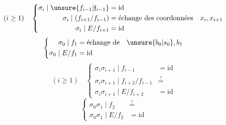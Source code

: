 \[
(i\geq1)\quad\left\{\begin{aligned}
\sigma_i\mid\unsure{f_{i-1}|\mathfrak f_{i-1}}&=\mathrm{id}\\
\sigma_i\mid(f_{i+1}/f_{i-1})&=\text{échange des coordonnées}\quad x_i,x_{i+1}\\
\sigma_i\mid E/f_{i+1}&=\mathrm{id}
\end{aligned}\right.
\]
\[
\left\{\begin{aligned}
\sigma_0\mid f_1&=\text{échange de}\quad\unsure{b_0|s_0},b_1\\
\sigma_0\mid E/f_1&=\mathrm{id}
\end{aligned}\right.
\]
\[
(i\geq1)\quad\left\{\begin{aligned}
\sigma_i\sigma_{i+1}\mid f_{i-1}&=\mathrm{id}\\
\sigma_i\sigma_{i+1}\mid f_{i+2}/f_{i-1}&\overset{?}{=}\\
\sigma_i\sigma_{i+1}\mid E/f_{i+2}&=\mathrm{id}
\end{aligned}\right.
\]
\[
\left\{\begin{aligned}
\sigma_0\sigma_1\mid f_2&\overset{?}{=}\\
\sigma_0\sigma_1\mid E/f_2&=\mathrm{id}
\end{aligned}\right.
\]
